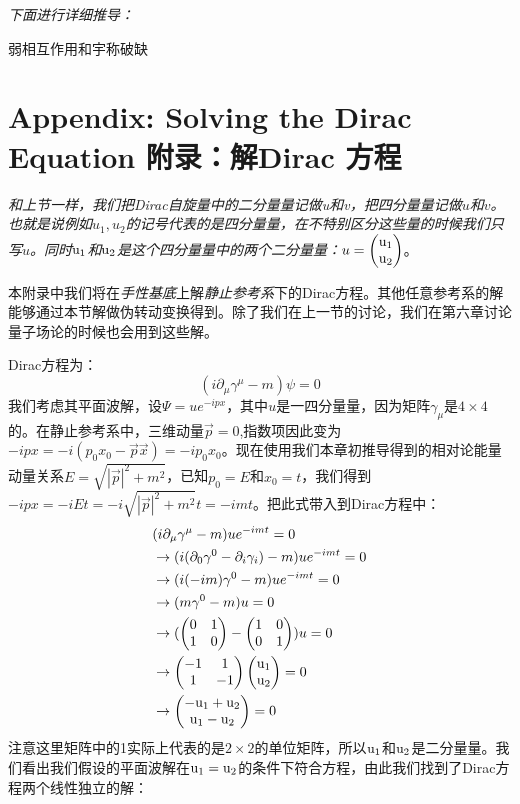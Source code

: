 {\it 下面进行详细推导：}

弱相互作用和宇称破缺



\section[附录：解Dirac 方程]{Appendix: Solving the Dirac Equation 附录：解Dirac 方程}\label{sec8.9}
{\it 和上节一样，我们把Dirac自旋量中的二分量量记做{\rm u}和{\rm v}，把四分量量记做$u$和$v$。也就是说例如$u_1,u_2$的记号代表的是四分量量，在不特别区分这些量的时候我们只写$u$。同时${\rm u_1}$和${\rm u_2}$是这个四分量量中的两个二分量量：$u=\begin{pmatrix} \rm u_1 \\ \rm u_2 \end{pmatrix} $}。
\par
本附录中我们将在{\it 手性基底}上解{\it 静止参考系}下的Dirac方程。其他任意参考系的解能够通过本节解做伪转动变换得到。除了我们在上一节的讨论，我们在第六章讨论量子场论的时候也会用到这些解。\par
Dirac方程为：
\begin{equation}
(i\partial_\mu \gamma^\mu -m)\psi=0
\end{equation}
我们考虑其平面波解，设$\Psi=ue^{-ipx}$，其中$u$是一四分量量，因为矩阵$\gamma_\mu$是$4 \times 4$的。在静止参考系中，三维动量$\vec{p}=0$,指数项因此变为$-ipx=-i(p_0x_0-\vec{p}\vec{x})=-ip_0x_0$。现在使用我们本章初推导得到的相对论能量动量关系$E=\sqrt{|\vec{p}|^2+m^2}$，已知$p_0=E$和$x_0=t$，我们得到$-ipx=-iEt=-i\sqrt{|\vec{p}|^2+m^2}t=-imt$。把此式带入到Dirac方程中：
\begin{equation}
\begin{split}
&(i\partial_\mu\gamma^\mu-m)ue^{-imt}=0\\
&\to (i(\partial_0\gamma^0-\partial_i\gamma_i)-m)ue^{-imt}=0\\
&\to (i(-im)\gamma^0-m)ue^{-imt}=0\\
&\to (m\gamma^0-m)u=0\\
&\to (\begin{pmatrix} 0 & 1 \\ 1 & 0 \end{pmatrix} -\begin{pmatrix} 1 & 0 \\ 0 & 1 \end{pmatrix})u=0\\
&\to \begin{pmatrix} -1 & 1 \\ 1 & -1 \end{pmatrix} \begin{pmatrix} \rm u_1 \\ \rm u_2 \end{pmatrix} =0\\
&\to \begin{pmatrix} \rm -u_1+u_2 \\ \rm u_1-u_2 \end{pmatrix} =0
\end{split}
\end{equation}
注意这里矩阵中的1实际上代表的是$2 \times 2$的单位矩阵，所以$\rm u_1$和$\rm u_2$是二分量量。我们看出我们假设的平面波解在$\rm u_1 =u_2$的条件下符合方程，由此我们找到了Dirac方程两个线性独立的解：
